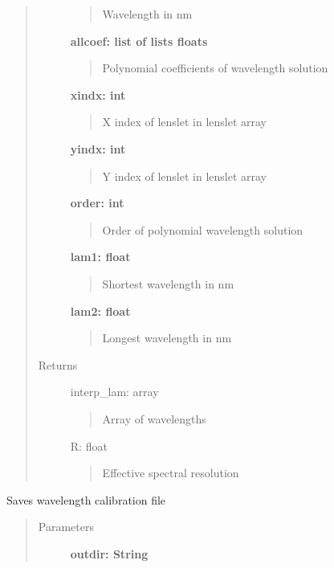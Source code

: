 \documentclass[letterpaper,10pt,english]{sphinxmanual}
\begin{document}
\begin{fulllineitems}
\begin{fulllineitems}
\begin{quote}
\begin{description}
\begin{quote}
Wavelength in nm
\end{quote}

\textbf{allcoef: list of lists floats}
\begin{quote}

Polynomial coefficients of wavelength solution
\end{quote}

\textbf{xindx: int}
\begin{quote}

X index of lenslet in lenslet array
\end{quote}

\textbf{yindx: int}
\begin{quote}

Y index of lenslet in lenslet array
\end{quote}

\textbf{order: int}
\begin{quote}

Order of polynomial wavelength solution
\end{quote}

\textbf{lam1: float}
\begin{quote}

Shortest wavelength in nm
\end{quote}

\textbf{lam2: float}
\begin{quote}

Longest wavelength in nm
\end{quote}

\item[{Returns}] \leavevmode
interp\_lam: array
\begin{quote}

Array of wavelengths
\end{quote}

R: float
\begin{quote}

Effective spectral resolution
\end{quote}

\end{description}\end{quote}

\end{fulllineitems}


\begin{fulllineitems}
\label{tools:tools.locate_psflets.PSFLets.savepixsol}
Saves wavelength calibration file
\begin{quote}\begin{description}
\item[{Parameters}] \leavevmode
\textbf{outdir: String}
\begin{quote}


\end{quote}
\end{description}
\end{quote}
\end{fulllineitems}
\end{fulllineitems}
\end{document}

